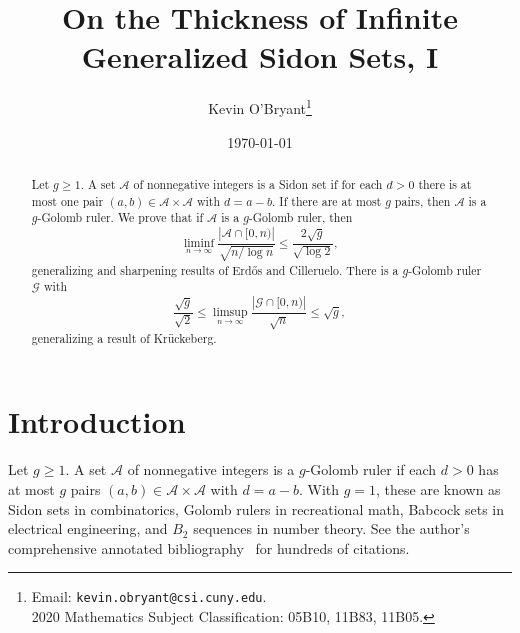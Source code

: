 \documentclass[10pt]{article}
\newcommand{\cA}{\mathcal{A}}
\newcommand{\cG}{\mathcal{G}}
\begin{document}
  \title{On the Thickness of Infinite Generalized Sidon Sets, I}
  \author{Kevin O'Bryant\thanks{Email: \texttt{kevin.obryant@csi.cuny.edu}.\\ 2020 Mathematics Subject Classification: 05B10, 11B83, 11B05.}}
  \date{\today}
  \maketitle

\begin{abstract}
  Let $g \ge1$. A set $\cA$ of nonnegative integers is a Sidon set if for each $d>0$ there is at most one pair $(a,b)\in\cA\times\cA$ with $d=a-b$. If there are at most $g$ pairs, then $\cA$ is a $g$-Golomb ruler. We prove that if $\cA$ is a $g$-Golomb ruler, then
  \[\liminf_{n\to\infty} \frac{|\cA\cap[0,n)|}{\sqrt{n/\log n}} \le \frac{2\sqrt g }{\sqrt{\log 2}},\]
  generalizing and sharpening results of Erdős and Cilleruelo.
  There is a $g$-Golomb ruler $\cG$ with
  \[\frac{\sqrt g }{\sqrt2} \le \limsup_{n\to\infty} \frac{|\cG\cap[0,n)|}{\sqrt n} \le \sqrt{g } ,\]
  generalizing a result of Kr\"uckeberg.
\end{abstract}

\section{Introduction}
Let $g \ge1$. A set $\cA$ of nonnegative integers is a $g$-Golomb ruler if each $d>0$ has at most $g$ pairs $(a,b)\in\cA\times\cA$ with $d=a-b$. With $g =1$, these are known as Sidon sets in combinatorics, Golomb rulers in recreational math, Babcock sets in electrical engineering, and $B_2$ sequences in number theory. See the author's comprehensive annotated bibliography~\cite{2004.Obryant} for hundreds of citations.
\end{document}
